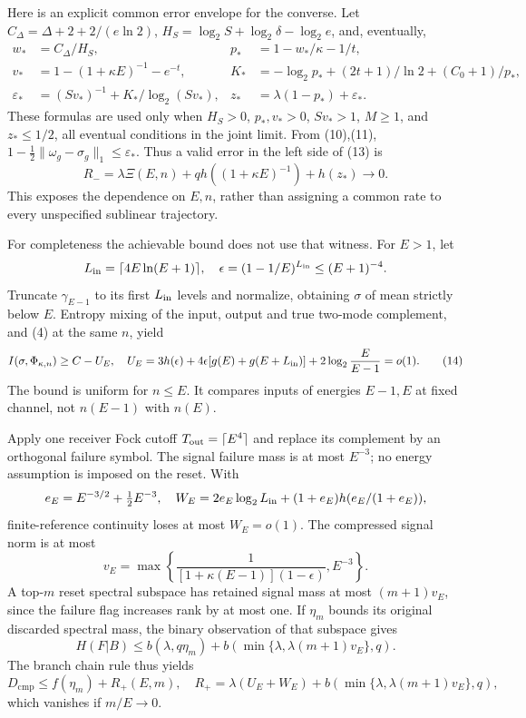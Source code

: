 \documentclass[11pt]{article}
\newcommand{\cmp}{\mathrm{cmp}}
\newcommand{\PhiT}{\Phi_{\kappa,n}}
\begin{document}
Here is an explicit common error envelope for the converse.
Let \(C_\Delta=\Delta+2+2/(e\ln2)\),
\(H_S=\log_2S+\log_2\delta-\log_2e\), and, eventually,
\[
\begin{aligned}
 w_*&=C_\Delta/H_S,& p_*&=1-w_*/\kappa-1/t,\\
 v_*&=1-(1+\kappa E)^{-1}-e^{-t},&
 K_*&=-\log_2p_*+(2t+1)/\ln2+(C_0+1)/p_*,\\
 \varepsilon_*&=(Sv_*)^{-1}+K_*/\log_2(Sv_*),&
 z_*&=\lambda(1-p_*)+\varepsilon_* .
\end{aligned}
\]
These formulas are used only when \(H_S>0\), \(p_*,v_*>0\),
\(Sv_*>1\), \(M\ge1\), and \(z_*\le1/2\), all eventual
conditions in the joint limit. From (10),(11),
\(1-\tfrac12\|\omega_g-\sigma_g\|_1\le\varepsilon_*\).
Thus a valid error in the left side of (13) is
\[
 R_-=\lambda\Xi(E,n)+qh((1+\kappa E)^{-1})+h(z_*)\longrightarrow0.
 \tag{13a}
\]
This exposes the dependence on \(E,n\), rather than assigning a common
rate to every unspecified sublinear trajectory.

For completeness the achievable bound does not use that witness.
For \(E>1\), let
\[
 L_{\rm in}=\lceil4E\ln(E+1)\rceil,\quad
 \epsilon=(1-1/E)^{L_{\rm in}}\le(E+1)^{-4}.
\]
Truncate \(\gamma_{E-1}\) to its first \(L_{\rm in}\) levels and normalize,
obtaining \(\sigma\) of mean strictly below \(E\).
Entropy mixing of the input, output and true two-mode complement, and
(4) at the same \(n\), yield
\[
 I(\sigma,\PhiT)\ge C-U_E,\quad
 U_E=3h(\epsilon)+4\epsilon[g(E)+g(E+L_{\rm in})]
                         +2\log_2\frac E{E-1}=o(1).         \tag{14}
\]
The bound is uniform for \(n\le E\). It compares inputs of energies
\(E-1,E\) at fixed channel, not \(n(E-1)\) with \(n(E)\).

Apply one receiver Fock cutoff \(T_{\rm out}=\lceil E^4\rceil\)
and replace its complement by an orthogonal failure symbol.
The signal failure mass is at most \(E^{-3}\); no energy assumption
is imposed on the reset. With
\[
 e_E=E^{-3/2}+\tfrac12E^{-3},\quad
 W_E=2e_E\log_2L_{\rm in}
       +(1+e_E)h(e_E/(1+e_E)),
\]
finite-reference continuity \cite[Lemma~2]{winter} loses at most
\(W_E=o(1)\). The compressed signal norm is at most
\[
 v_E=\max\left\{\frac1{[1+\kappa(E-1)](1-\epsilon)},E^{-3}\right\}.
\]
A top-\(m\) reset spectral subspace has retained signal mass at most
\((m+1)v_E\), since the failure flag increases rank by at most one.
If \(\eta_m\) bounds its original discarded spectral mass, the binary
observation of that subspace gives
\[
 H(F|B)\le b(\lambda,q\eta_m)
       +b(\min\{\lambda,\lambda(m+1)v_E\},q).
\]
The branch chain rule thus yields
\[
 D_{\cmp}\le f(\eta_m)+R_+(E,m),\quad
 R_+=\lambda(U_E+W_E)+
          b(\min\{\lambda,\lambda(m+1)v_E\},q),               \tag{15}
\]
which vanishes if \(m/E\to0\).
\end{document}
